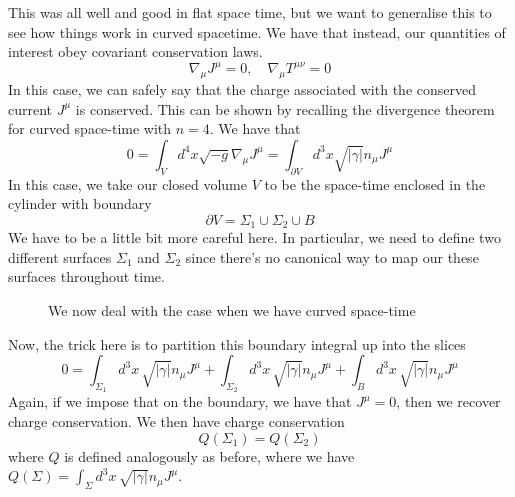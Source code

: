 This was all well and good in flat space time,
but we want to generalise this to 
see how things work in curved spacetime. 
We have that instead, our quantities of 
interest obey covariant conservation laws. 
\[
\nabla _ \mu J ^ \mu  =0 , \quad \nabla _ \mu T ^{ \mu \nu }  =0 
\] In this case, we 
can safely say that the charge associated with 
the conserved current $ J ^ \mu $ is conserved.
This can be shown by recalling the divergence theorem 
for curved space-time with $ n  = 4  $.  
We have that 
\[
0  = \int_{ V } d ^ 4  x \sqrt{ - g }  \nabla _ \mu J ^ \mu  = \int _{ \partial  V } 
d ^ 3  x \sqrt{  | \gamma | }  n _ \mu J ^ \mu 
\] In this case, we take 
our closed volume $ V $ to be the space-time enclosed in the
cylinder with boundary 
\[
\partial  V  = \Sigma _ 1 \cup \Sigma _ 2 \cup B 
\] We have to be a little bit more 
careful here. In particular, 
we need to define two different 
surfaces $ \Sigma _ 1 $ and $ \Sigma _ 2 $ 
since there's no canonical way to 
map our these surfaces throughout time. 
\begin{figure}[h]
\centering

\caption{We now deal with the case when we have curved space-time}%
\label{fig:}
\end{figure}
Now, the trick here is to partition this boundary integral up 
into the slices
\[
0  = \int _{ \Sigma_ 1 } d ^ 3 x \, \sqrt{ | \gamma | }  n _ \mu J ^ \mu + 
\int _{ \Sigma_ 2 } d ^ 3 x \, \sqrt{ | \gamma | }  n_ \mu J ^ \mu + 
\int _ B d ^ 3 x \, \sqrt{ | \gamma | }  n _ \mu J ^ \mu 
\] Again, if we impose that on the boundary, we 
have that $ J ^ \mu  = 0 $, then we recover 
charge conservation.
We then have 
charge conservation 
\[
Q ( \Sigma _ 1) = Q ( \Sigma _ 2 ) 
\] where $ Q $ is defined analogously as before, 
where we have $ Q ( \Sigma )  = \int _{ \Sigma } d ^ 3 x \, \sqrt{ | \gamma | }  n _\mu J ^ \mu  $. 

